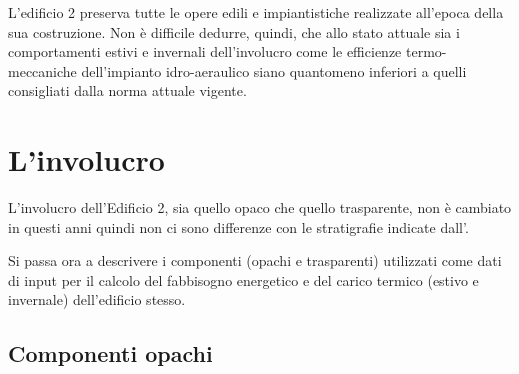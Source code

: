 L'edificio 2 preserva tutte le opere edili e impiantistiche realizzate all'epoca della sua costruzione. Non è difficile dedurre, quindi, che allo stato attuale sia i comportamenti estivi e invernali dell'involucro come le efficienze termo-meccaniche dell'impianto idro-aeraulico siano quantomeno inferiori a quelli consigliati dalla norma attuale vigente. 

\section{L'involucro}
L'involucro dell'Edificio 2, sia quello opaco che quello trasparente, non è cambiato in questi anni quindi non ci sono differenze con le stratigrafie indicate dall'.

Si passa ora a descrivere i componenti (opachi e trasparenti) utilizzati come dati di input per il calcolo del fabbisogno energetico e del carico termico (estivo e invernale) dell'edificio stesso.
\subsection{Componenti opachi}
